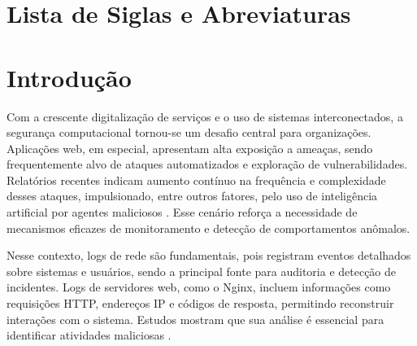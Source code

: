 \documentclass[12pt,a4paper]{report}
\begin{document}
\chapter*{Lista de Siglas e Abreviaturas}
\begin{acronym}
\end{acronym}

\chapter*{Introdução}

Com a crescente digitalização de serviços e o uso de sistemas interconectados, a segurança computacional tornou-se um desafio central para organizações. Aplicações web, em especial, apresentam alta exposição a ameaças, sendo frequentemente alvo de ataques automatizados e exploração de vulnerabilidades. Relatórios recentes indicam aumento contínuo na frequência e complexidade desses ataques, impulsionado, entre outros fatores, pelo uso de inteligência artificial por agentes maliciosos \cite{forbes2024}. Esse cenário reforça a necessidade de mecanismos eficazes de monitoramento e detecção de comportamentos anômalos.

Nesse contexto, logs de rede são fundamentais, pois registram eventos detalhados sobre sistemas e usuários, sendo a principal fonte para auditoria e detecção de incidentes. Logs de servidores web, como o Nginx, incluem informações como requisições HTTP, endereços IP e códigos de resposta, permitindo reconstruir interações com o sistema. Estudos mostram que sua análise é essencial para identificar atividades maliciosas \cite{hussein2024, komadina2024}.
\end{document}
